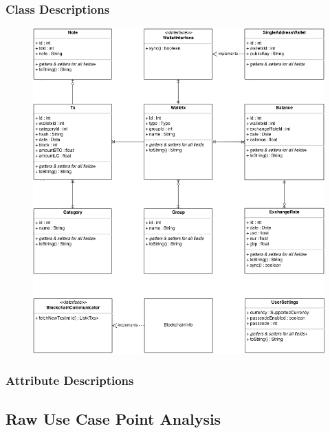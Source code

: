     \subsubsection{Class Descriptions}
      \begin{figure}[H]
        \includegraphics[width=1.0\textwidth]{../diagrams/classes_model.png}
      \end{figure}

    \subsubsection{Attribute Descriptions}
  \subsection{Raw Use Case Point Analysis}

